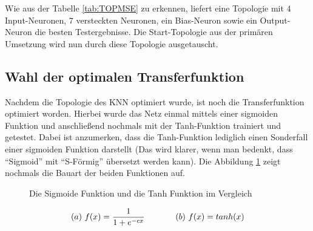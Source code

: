 Wie aus der Tabelle \ref{tab:TOPMSE} zu erkennen, liefert eine Topologie mit $4$ Input-Neuronen, $7$ versteckten Neuronen, ein Bias-Neuron sowie ein Output-Neuron die besten Testergebnisse. Die Start-Topologie aus der primären Umsetzung wird nun durch diese Topologie ausgetauscht.

\subsection{Wahl der optimalen Transferfunktion} 
\label{subsection:Wahl der optimalen Transferfunktion} 

Nachdem die Topologie des KNN optimiert wurde, ist noch die Transferfunktion optimiert worden. Hierbei wurde das Netz einmal mittels einer sigmoiden Funktion und anschließend nochmals mit der Tanh-Funktion trainiert und getestet. Dabei ist anzumerken, dass die Tanh-Funktion lediglich einen Sonderfall einer sigmoiden Funktion darstellt (Das wird klarer, wenn man bedenkt, dass "`Sigmoid"' mit "`S-Förmig"' übersetzt werden kann). Die Abbildung \ref{fig:sigtanh}
zeigt nochmals die Bauart der beiden Funktionen auf.

\begin{figure}[H]
\hfill
{}
\hfill
{}
\hfill
\caption{Die Sigmoide Funktion und die Tanh Funktion im Vergleich}
\label{fig:sigtanh}
\end{figure}

\begin{equation}\formelentry{Sigmoide Funktion sowie Tanh Funktion}
(a)\ f(x)= \frac{1}{1+e^{-cx}}\ \ \ \ \ \ \ \ \ \ \ (b)\ f(x)= tanh(x)
\end{equation}


